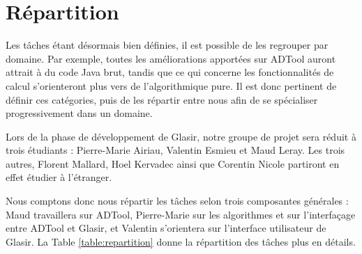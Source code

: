 \section{Répartition}
	\label{sec:repartition}

	Les tâches étant désormais bien définies, il est possible de les regrouper par domaine. Par exemple, toutes les améliorations apportées sur ADTool auront attrait à du code Java brut, tandis que ce qui concerne les fonctionnalités de calcul s'orienteront plus vers de l'algorithmique pure. Il est donc pertinent de définir ces catégories, puis de les répartir entre nous afin de se \og spécialiser \fg{} progressivement dans un domaine.
	
	Lors de la phase de développement de Glasir, notre groupe de projet sera réduit à trois étudiants : Pierre-Marie {\sc Airiau}, Valentin {\sc Esmieu} et Maud {\sc Leray}. Les trois autres, Florent {\sc Mallard}, Hoel {\sc Kervadec} ainsi que Corentin {\sc Nicole} partiront en effet étudier à l'étranger.
	
	Nous comptons donc nous répartir les tâches selon trois composantes générales : Maud travaillera sur ADTool, Pierre-Marie sur les algorithmes et sur l'interfaçage entre ADTool et Glasir, et Valentin s'orientera sur l'interface utilisateur de Glasir. La {\sc Table} \ref{table:repartition} donne la répartition des tâches plus en détails.
		


